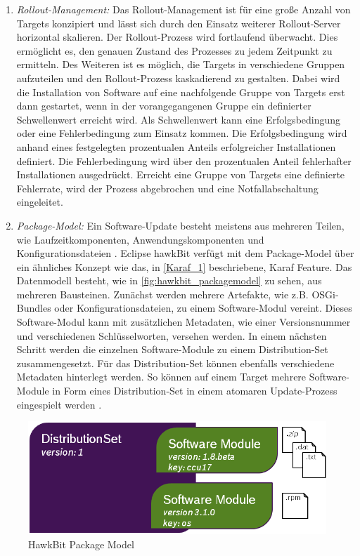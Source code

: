 \begin{enumerate}
 \item \textit{Rollout-Management:} Das Rollout-Management ist für eine große Anzahl von Targets konzipiert und lässt sich durch 
 den Einsatz weiterer Rollout-Server horizontal skalieren. Der Rollout-Prozess wird fortlaufend überwacht. Dies ermöglicht es, den genauen Zustand des Prozesses zu
 jedem Zeitpunkt zu ermitteln. Des Weiteren ist es möglich, die Targets in verschiedene Gruppen aufzuteilen und den Rollout-Prozess kaskadierend zu gestalten. 
 Dabei wird die Installation von Software auf eine nachfolgende Gruppe von Targets erst dann gestartet, wenn in der vorangegangenen Gruppe ein definierter Schwellenwert erreicht wird.
 Als Schwellenwert kann eine Erfolgsbedingung oder eine Fehlerbedingung zum Einsatz kommen.
 Die Erfolgsbedingung wird anhand eines festgelegten prozentualen Anteils erfolgreicher Installationen definiert.
 Die Fehlerbedingung wird über den prozentualen Anteil fehlerhafter Installationen ausgedrückt. 
 Erreicht eine Gruppe von Targets eine definierte Fehlerrate, wird der Prozess abgebrochen und eine Notfallabschaltung eingeleitet. 
 
 \item \textit{Package-Model: } Ein Software-Update besteht meistens aus mehreren Teilen, wie Laufzeitkomponenten, Anwendungskomponenten und Konfigurationsdateien \cite{jaxenter_hawkbit}. 
 Eclipse hawkBit verfügt mit dem Package-Model über ein ähnliches Konzept wie das, in \autoref{Karaf_1} beschriebene, Karaf Feature.
 Das Datenmodell besteht, wie in \autoref{fig:hawkbit_packagemodel} zu sehen, aus mehreren Bausteinen. Zunächst werden mehrere Artefakte, 
 wie z.B. \ac{OSGi}-Bundles oder Konfigurationsdateien, zu einem Software-Modul vereint. Dieses Software-Modul kann mit zusätzlichen Metadaten, wie einer Versionsnummer und verschiedenen 
 Schlüsselworten, versehen werden. In einem nächsten Schritt werden die einzelnen Software-Module zu einem Distribution-Set zusammengesetzt.
 Für das Distribution-Set können ebenfalls verschiedene Metadaten hinterlegt werden.
 So können auf einem Target mehrere Software-Module in Form eines Distribution-Set in einem atomaren Update-Prozess eingespielt werden \cite{jaxenter_hawkbit}.
\end{enumerate}

\begin{figure}[h]
 \centering
 \includegraphics[scale=0.55]{content/pictures/hawkbit_packagemodel.png}
 \caption{HawkBit Package Model \cite{jaxenter_hawkbit}}
 \label{fig:hawkbit_packagemodel}
\end{figure}

